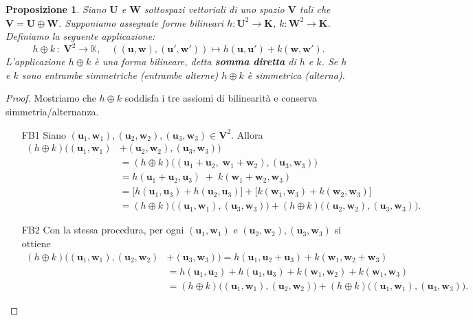 \documentclass{article}
\theoremstyle{plain}
\newtheorem{prop}[thm]{Proposizione}
\theoremstyle{definition}
\theoremstyle{remark}
\begin{document}
\begin{bxthm}
\begin{prop}
Siano $\mathbf{U}$ e $\mathbf{W}$ sottospazi vettoriali di uno spazio $\mathbf{V}$ tali che 
$\mathbf{V} = \mathbf{U} \oplus \mathbf{W}$. Supponiamo assegnate forme bilineari 
$h: \mathbf{U}^2 \to \mathbf{K}$, $k: \mathbf{W}^2 \to \mathbf{K}$. 
Definiamo la seguente applicazione:
\[h \oplus k \,:\;\mathbf{V}^2\to\mathbb{K},\quad ((\mathbf{u}, \mathbf{w}),(\mathbf{u}', \mathbf{w}'))\mapsto h(\mathbf{u}, \mathbf{u}') + k(\mathbf{w}, \mathbf{w}').\]
L'applicazione $h \oplus k$ è una forma bilineare, detta \textbf{somma diretta} di $h$ e $k$. 
Se $h$ e $k$ sono entrambe simmetriche (entrambe alterne) $h \oplus k$ è simmetrica (alterna).     
\end{prop}
\end{bxthm}
\begin{proof}
    Mostriamo che \(h\oplus k\) soddisfa i tre assiomi di bilinearità e conserva simmetria/alternanza.

    \begin{itemize}
        \item[FB1]  Siano \((\mathbf{u}_1,\mathbf{w}_1),(\mathbf{u}_2,\mathbf{w}_2),(\mathbf{u}_3,\mathbf{w}_3)\in \mathbf{V}^2\). Allora
        \[
        \begin{aligned}
        (h\oplus k)\bigl((\mathbf{u}_1,\mathbf{w}_1)&+(\mathbf{u}_2,\mathbf{w}_2),(\mathbf{u}_3,\mathbf{w}_3)\bigr)\\
        &= (h\oplus k)\bigl((\mathbf{u}_1+\mathbf{u}_2,\;\mathbf{w}_1+\mathbf{w}_2),(\mathbf{u}_3,\mathbf{w}_3)\bigr)\\
        &= h(\mathbf{u}_1+\mathbf{u}_2,\mathbf{u}_3)\;+\;k(\mathbf{w}_1+\mathbf{w}_2,\mathbf{w}_3)\\
        &= \bigl[h(\mathbf{u}_1,\mathbf{u}_3)+h(\mathbf{u}_2,\mathbf{u}_3)\bigr]
           +\bigl[k(\mathbf{w}_1,\mathbf{w}_3)+k(\mathbf{w}_2,\mathbf{w}_3)\bigr]\\
        &= (h\oplus k)\bigl((\mathbf{u}_1,\mathbf{w}_1),(\mathbf{u}_3,\mathbf{w}_3)\bigr)
         + (h\oplus k)\bigl((\mathbf{u}_2,\mathbf{w}_2),(\mathbf{u}_3,\mathbf{w}_3)\bigr).
        \end{aligned}
        \]

        \item[FB2]  Con la stessa procedura, per ogni \((\mathbf{u}_1,\mathbf{w}_1)\) e \((\mathbf{u}_2,\mathbf{w}_2),(\mathbf{u}_3,\mathbf{w}_3)\) si ottiene
        \[
        \begin{aligned}
        (h\oplus k)\bigl((\mathbf{u}_1,\mathbf{w}_1),(\mathbf{u}_2,\mathbf{w}_2)&+(\mathbf{u}_3,\mathbf{w}_3)\bigr)
        = h(\mathbf{u}_1,\mathbf{u}_2+\mathbf{u}_3)+k(\mathbf{w}_1,\mathbf{w}_2+\mathbf{w}_3)\\
        &= h(\mathbf{u}_1,\mathbf{u}_2)+h(\mathbf{u}_1,\mathbf{u}_3)
         +k(\mathbf{w}_1,\mathbf{w}_2)+k(\mathbf{w}_1,\mathbf{w}_3)\\
        &= (h\oplus k)\bigl((\mathbf{u}_1,\mathbf{w}_1),(\mathbf{u}_2,\mathbf{w}_2)\bigr)
         +(h\oplus k)\bigl((\mathbf{u}_1,\mathbf{w}_1),(\mathbf{u}_3,\mathbf{w}_3)\bigr).
        \end{aligned}
        \]


\end{itemize}
\end{proof}
\end{document}
